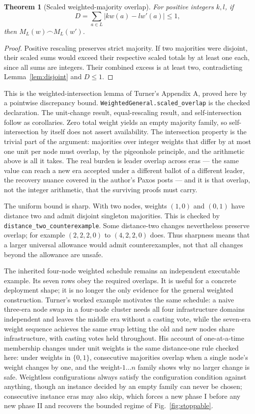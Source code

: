 \documentclass[10pt,journal,letterpaper]{IEEEtran}
\newtheorem{theorem}{Theorem}
\newcommand{\inter}{\mathrel{\frown}}
\newcommand{\code}[1]{\texttt{\small #1}}
\begin{document}
\begin{theorem}[Scaled weighted-majority overlap]\label{thm:weights}
For positive integers $k,l$, if
\[
 D=\sum_{a\in L}|k w(a)-l w'(a)|\le1,
\]
then $M_L(w)\inter M_L(w')$.
\end{theorem}
\begin{proof}
Positive rescaling preserves strict majority. If two majorities were
disjoint, their scaled sums would exceed their respective scaled totals by
at least one each, since all sums are integers. Their combined excess is at
least two, contradicting Lemma~\ref{lem:disjoint} and $D\le1$.
\end{proof}
This is the weighted-intersection lemma of Turner's Appendix A, proved here
by a pointwise discrepancy bound. \code{WeightedGeneral.scaled\_overlap} is
the checked declaration. The unit-change result, equal-rescaling result, and
self-intersection follow as corollaries. Zero total weight yields an empty
majority family, so self-intersection by itself does not assert availability.
The intersection property is the trivial part of the argument: majorities
over integer weights that differ by at most one unit per node must overlap, by
the pigeonhole principle, and the arithmetic above is all it takes. The real
burden is leader overlap across eras --- the same value can reach a new era
accepted under a different ballot of a different leader, the recovery nuance
covered in the author's Paxos posts \cite{trexposts} --- and it is that
overlap, not the integer arithmetic, that the surviving proofs must carry.

The uniform bound is sharp. With two nodes, weights $(1,0)$ and $(0,1)$ have
distance two and admit disjoint singleton majorities. This is checked by
\code{distance\_two\_counterexample}. Some distance-two changes nevertheless
preserve overlap; for example $(2,2,2,0)$ to $(4,2,2,0)$ does. Thus sharpness
means that a larger universal allowance would admit counterexamples, not that
all changes beyond the allowance are unsafe.

The inherited four-node weighted schedule remains an independent executable
example. Its seven rows obey the required overlaps. It is useful for a
concrete deployment shape; it is no longer the only evidence for the general
weighted construction. Turner's worked example motivates the same schedule:
a naive three-era node swap in a four-node cluster needs all four
infrastructure domains independent and leaves the middle era without a
casting vote, while the seven-era weight sequence achieves the same swap
letting the old and new nodes share infrastructure, with casting votes held
throughout. His account of one-at-a-time membership changes under unit
weights is the same distance-one rule checked here: under weights in
$\{0,1\}$, consecutive majorities overlap when a single node's weight
changes by one, and the weight-$1\ldots n$ family shows why no larger change
is safe. Weightless configurations always satisfy the configuration
condition against anything, though an instance decided by an empty family can
never be chosen; consecutive instance eras may also skip, which forces a new
phase I before any new phase II and recovers the bounded regime of
Fig.~\ref{fig:stoppable}.
\end{document}
